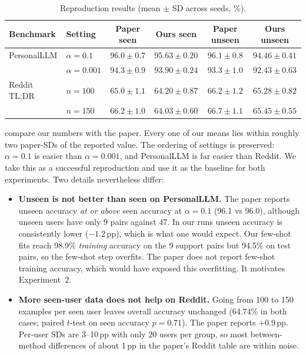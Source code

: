 \documentclass[11pt,a4paper]{article}
\newcommand{\pp}{\,pp\xspace}
\begin{document}
\begin{table}[t]
\centering\small
\caption{Reproduction results (mean $\pm$ SD across seeds, \%).}
\label{tab:repro}
\begin{tabular}{@{}llcccc@{}}
\toprule
Benchmark & Setting & Paper seen & Ours seen & Paper unseen & Ours unseen \\
\midrule
PersonalLLM & $\alpha=0.1$   & $96.0\pm0.7$ & $95.63\pm0.20$ & $96.1\pm0.8$ & $94.46\pm0.41$ \\
            & $\alpha=0.001$ & $94.3\pm0.9$ & $93.90\pm0.24$ & $93.3\pm1.0$ & $92.43\pm0.63$ \\
\midrule
Reddit TL;DR & $n=100$ & $65.0\pm1.1$ & $64.20\pm0.87$ & $66.2\pm1.2$ & $65.28\pm0.82$ \\
             & $n=150$ & $66.2\pm1.0$ & $64.03\pm0.60$ & $66.7\pm1.1$ & $65.45\pm0.55$ \\
\bottomrule
\end{tabular}
\end{table}

 compare our numbers with the paper. Every one of our means lies within
roughly two paper-SDs of the reported value. The ordering of settings is preserved: $\alpha=0.1$ is
easier than $\alpha=0.001$, and PersonalLLM is far easier than Reddit. We take this as a successful
reproduction and use it as the baseline for both experiments. Two details nevertheless differ:

\begin{itemize}
\item \textbf{Unseen is not better than seen on PersonalLLM.} The paper reports unseen accuracy \emph{at or above}
seen accuracy at $\alpha=0.1$ (96.1 vs 96.0), although unseen users have only 9 pairs against 47. In
our runs unseen accuracy is consistently lower ($-1.2$\pp), which is what one would expect. Our
few-shot fits reach 98.9\% \emph{training} accuracy on the 9 support pairs but 94.5\% on test pairs,
so the few-shot step overfits. The paper does not report few-shot training accuracy, which would have
exposed this overfitting. It motivates Experiment~2.
\item \textbf{More seen-user data does not help on Reddit.} Going from 100 to 150 examples per seen user
leaves overall accuracy unchanged (64.74\% in both cases; paired $t$-test on seen accuracy $p=0.71$). The
paper reports $+0.9$\pp. Per-user SDs are 3--10\pp with only 20 users per group, so most
between-method differences of about 1\pp in the paper's Reddit table are within noise.
\end{itemize}
\end{document}
